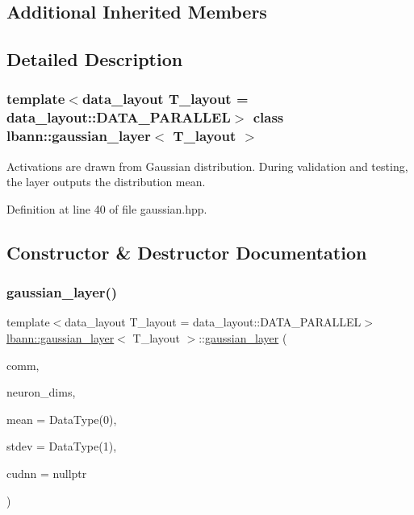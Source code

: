 \subsection*{Additional Inherited Members}


\subsection{Detailed Description}
\subsubsection*{template$<$data\+\_\+layout T\+\_\+layout = data\+\_\+layout\+::\+D\+A\+T\+A\+\_\+\+P\+A\+R\+A\+L\+L\+EL$>$\newline
class lbann\+::gaussian\+\_\+layer$<$ T\+\_\+layout $>$}

Activations are drawn from Gaussian distribution. During validation and testing, the layer outputs the distribution mean. 

Definition at line 40 of file gaussian.\+hpp.



\subsection{Constructor \& Destructor Documentation}
\mbox{\label{classlbann_1_1gaussian__layer_af130978295e70d9d6521bf998052d298}} 
\subsubsection{\texorpdfstring{gaussian\+\_\+layer()}{gaussian\_layer()}}
{\footnotesize\ttfamily template$<$data\+\_\+layout T\+\_\+layout = data\+\_\+layout\+::\+D\+A\+T\+A\+\_\+\+P\+A\+R\+A\+L\+L\+EL$>$ \\
\hyperlink{classlbann_1_1gaussian__layer}{lbann\+::gaussian\+\_\+layer}$<$ T\+\_\+layout $>$\+::\hyperlink{classlbann_1_1gaussian__layer}{gaussian\+\_\+layer} (\begin{DoxyParamCaption}\item[{\hyperlink{classlbann_1_1lbann__comm}{lbann\+\_\+comm} $\ast$}]{comm,  }\item[{const std\+::vector$<$ int $>$ \&}]{neuron\+\_\+dims,  }\item[{Data\+Type}]{mean = {\ttfamily DataType(0)},  }\item[{Data\+Type}]{stdev = {\ttfamily DataType(1)},  }\item[{\hyperlink{classlbann_1_1cudnn_1_1cudnn__manager}{cudnn\+::cudnn\+\_\+manager} $\ast$}]{cudnn = {\ttfamily nullptr} }\end{DoxyParamCaption})\hspace{0.3cm}{\ttfamily [inline]}}



